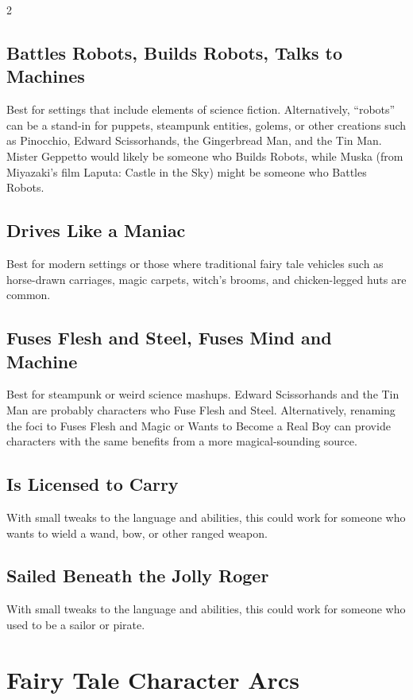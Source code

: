 \begin{multicols}{2}
\subsection{Battles Robots, Builds Robots, Talks to Machines}

Best for settings that include elements of science fiction. Alternatively, “robots” can be a stand-in for puppets, steampunk entities, golems, or other creations such as Pinocchio, Edward Scissorhands, the Gingerbread Man, and the Tin Man. Mister Geppetto would likely be someone who Builds Robots, while Muska (from Miyazaki’s film Laputa: Castle in the Sky) might be someone who Battles Robots.

\subsection{Drives Like a Maniac}

Best for modern settings or those where traditional fairy tale vehicles such as horse-drawn carriages, magic carpets, witch’s brooms, and chicken-legged huts are common.

\subsection{Fuses Flesh and Steel, Fuses Mind and Machine}

Best for steampunk or weird science mashups. Edward Scissorhands and the Tin Man are probably characters who Fuse Flesh and Steel. Alternatively, renaming the foci to Fuses Flesh and Magic or Wants to Become a Real Boy can provide characters with the same benefits from a more magical-sounding source.

\subsection{Is Licensed to Carry}

With small tweaks to the language and abilities, this could work for someone who wants to wield a wand, bow, or other ranged weapon. 

\subsection{Sailed Beneath the Jolly Roger}

With small tweaks to the language and abilities, this could work for someone who used to be a sailor or pirate.

\section{Fairy Tale Character Arcs}


\end{multicols}
